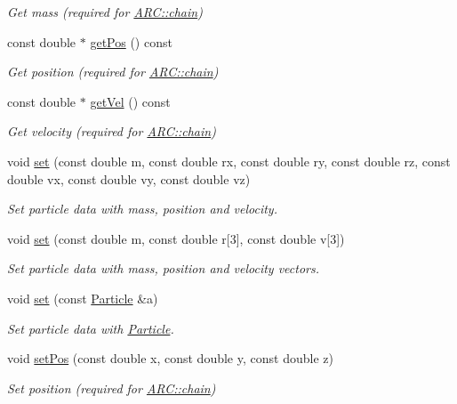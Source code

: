 \begin{DoxyCompactItemize}
\begin{DoxyCompactList}\small\item\em Get mass (required for \hyperlink{classARC_1_1chain}{A\+R\+C\+::chain}) \end{DoxyCompactList}\item 
const double $\ast$ \hyperlink{classParticle_abe0e7a4726615f08d4f5119c6f0fd6aa}{get\+Pos} () const 
\begin{DoxyCompactList}\small\item\em Get position (required for \hyperlink{classARC_1_1chain}{A\+R\+C\+::chain}) \end{DoxyCompactList}\item 
const double $\ast$ \hyperlink{classParticle_af4fc2ad393343867b02534d4a75659f0}{get\+Vel} () const 
\begin{DoxyCompactList}\small\item\em Get velocity (required for \hyperlink{classARC_1_1chain}{A\+R\+C\+::chain}) \end{DoxyCompactList}\item 
void \hyperlink{classParticle_a662b86df904c9a664e0e45d93b1f4715}{set} (const double m, const double rx, const double ry, const double rz, const double vx, const double vy, const double vz)
\begin{DoxyCompactList}\small\item\em Set particle data with mass, position and velocity. \end{DoxyCompactList}\item 
void \hyperlink{classParticle_a840d9f228177200f22ef062e4cc24851}{set} (const double m, const double r\mbox{[}3\mbox{]}, const double v\mbox{[}3\mbox{]})
\begin{DoxyCompactList}\small\item\em Set particle data with mass, position and velocity vectors. \end{DoxyCompactList}\item 
void \hyperlink{classParticle_a77b1b13894b46abed113c461270ed927}{set} (const \hyperlink{classParticle}{Particle} \&a)
\begin{DoxyCompactList}\small\item\em Set particle data with \hyperlink{classParticle}{Particle}. \end{DoxyCompactList}\item 
void \hyperlink{classParticle_a97d76b66aed57834c105b78b10643b81}{set\+Pos} (const double x, const double y, const double z)
\begin{DoxyCompactList}\small\item\em Set position (required for \hyperlink{classARC_1_1chain}{A\+R\+C\+::chain}) \end{DoxyCompactList}\item 

\end{DoxyCompactItemize}
